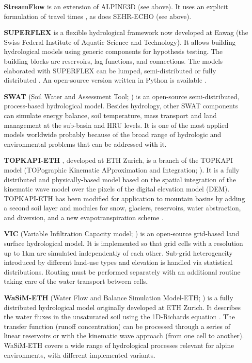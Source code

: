 \documentclass[10pt,a4paper]{article}
\begin{document}
\textbf{StreamFlow} is an extension of ALPINE3D (see above). It uses an
explicit formulation of travel times \citep{Comola2015}, as does
SEHR-ECHO (see above). 

\textbf{SUPERFLEX} \citep{Fenicia2011a,Kavetski2011} is a flexible hydrological framework
now developed at Eawag (the Swiss Federal Institute of Aquatic Science
and Technology). It allows building hydrological models using generic
components for hypothesis testing. The building blocks are reservoirs,
lag functions, and connections. The models elaborated with SUPERFLEX can
be lumped, semi-distributed \citep{Fenicia2016} or fully
distributed \citep{Hostache2020}. An open-source version written in Python
is available \citep{Molin2020}.

\textbf{SWAT} (Soil Water and Assessment Tool; \citealp{Arnold_1998}) is an
open-source semi-distributed, process-based hydrological model. Besides
hydrology, other SWAT components can simulate energy balance, soil
temperature, mass transport and land management at the sub-basin and HRU
levels. It is one of the most applied models worldwide probably because
of the broad range of hydrologic and environmental problems that can be
addressed with it.

\textbf{TOPKAPI-ETH} \citep{Finger_2011,Ragettli_2012}, developed at ETH Zurich, is a
branch of the TOPKAPI model (TOPographic Kinematic APproximation and
Integration; \citealp{Todini1995,Todini2002,Liu2002,Ciarapica_2002}). It is a fully distributed and
physically-based model based on the spatial integration of the kinematic
wave model over the pixels of the digital elevation model (DEM).
TOPKAPI-ETH has been modified for application to mountain basins by
adding a second soil layer and modules for snow, glaciers, reservoirs,
water abstraction, and diversion, and a new evapotranspiration
scheme \citep{Finger_2011,Finger_2012,Fatichi_2015a}.

\textbf{VIC} (Variable Infiltration Capacity model; \citealp{Liang1994a}) is
an open-source grid-based land surface hydrological model. It is
implemented so that grid cells with a resolution up to 1km are simulated
independently of each other. Sub-grid heterogeneity introduced by
different land-use types and elevation is handled via statistical
distributions. Routing must be performed separately with an additional
routine taking care of the water transport between cells.

\textbf{WaSiM-ETH} (Water Flow and Balance Simulation
Model-ETH; \citealp{Schulla2007,Schulla2009}) is a fully distributed hydrological
model originally developed at ETH Zurich. It describes the water fluxes
in the unsaturated soil using the 1D-Richards
equation \citep{Richards1931}. The transfer function (runoff
concentration) can be processed through a series of linear reservoirs or
with the kinematic wave approach (from one cell to another). WaSiM-ETH
covers a wide range of hydrological processes relevant for alpine
environments, with different implemented variants.
\end{document}
